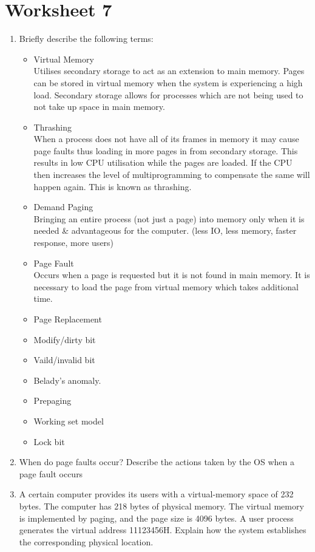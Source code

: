 \documentclass{article}
\newcommand{\answercolor}{Bittersweet}
\newcommand{\answer}[1]{\\\textcolor{\answercolor}{#1}}
\begin{document}
	\section{Worksheet 7}
	\begin{enumerate}
		\item Briefly describe the following terms:
			\begin{itemize}
				\item Virtual Memory
				\answer{Utilises secondary storage to act as an extension to main memory. Pages can be stored in virtual memory when the system is experiencing a high load. Secondary storage allows for processes which are not being used to not take up space in main memory.}
				\item Thrashing
				\answer{When a process does not have all of its frames in memory it may cause page faults thus loading in more pages in from secondary storage. This results in low CPU utilisation while the pages are loaded. If the CPU then increases the level of multiprogramming to compensate the same will happen again. This is known as thrashing.}
				\item Demand Paging
				\answer{Bringing an entire process (not just a page) into memory only when it is needed \& advantageous for the computer. (less IO, less memory, faster response, more users)}
				\item Page Fault
				\answer{Occurs when a page is requested but it is not found in main memory. It is necessary to load the page from virtual memory which takes additional time.}
				\item Page Replacement
				\item Modify/dirty bit
				\item Vaild/invalid bit
				\item Belady's anomaly.
				\item Prepaging
				\item Working set model
				\item Lock bit
			\end{itemize}
		\item When do page faults occur? Describe the actions taken by the OS when a page fault occurs
		\item A certain computer provides its users with a virtual-memory space of 232 bytes. The computer has 218 bytes of physical memory. The virtual memory is implemented by paging, and the page size is 4096 bytes. A user process generates the virtual address 11123456H. Explain how the system establishes the corresponding physical location.

\end{enumerate}
\end{document}
